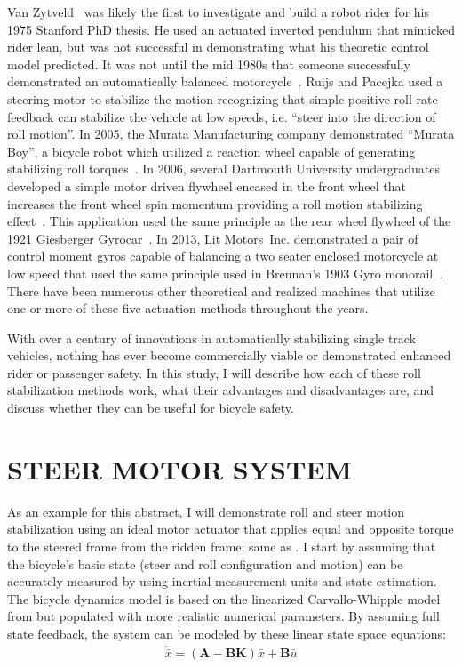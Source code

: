 \documentclass{icsc}
\begin{document}
Van Zytveld~\cite{Zytveld1975} was likely the first to investigate and build a
robot rider for his 1975 Stanford PhD thesis. He used an actuated inverted
pendulum that mimicked rider lean, but was not successful in demonstrating what
his theoretic control model predicted. It was not until the mid 1980s that
someone successfully demonstrated an automatically balanced
motorcycle~\cite{Ruijs1986a}. Ruijs and Pacejka used a steering motor to
stabilize the motion recognizing that simple positive roll rate feedback can
stabilize the vehicle at low speeds, i.e. ``steer into the direction of roll
motion''.
In 2005, the Murata Manufacturing company demonstrated ``Murata Boy'', a
bicycle robot which utilized a reaction wheel capable of generating stabilizing
roll torques~\cite{WikipediaAuthors2023}. In 2006, several Dartmouth University
undergraduates developed a simple motor driven flywheel encased in the front
wheel that increases the front wheel spin momentum providing a roll motion
stabilizing effect~\cite{Ward2006}. This application used the same principle as
the rear wheel flywheel of the 1921 Giesberger Gyrocar~\cite{Self2023}. In
2013, Lit Motors~Inc. demonstrated a pair of control moment gyros capable of
balancing a two seater enclosed motorcycle at low speed that used the same
principle used in Brennan's 1903 Gyro
monorail~\cite{WikipediaGyromonorail2012}. There have been numerous other
theoretical and realized machines that utilize one or more of these five
actuation methods throughout the years.

With over a century of innovations in automatically stabilizing single track
vehicles, nothing has ever become commercially viable or demonstrated enhanced
rider or passenger safety. In this study, I will describe how each of these
roll stabilization methods work, what their advantages and disadvantages are,
and discuss whether they can be useful for bicycle safety.

\section{STEER MOTOR SYSTEM}
%
As an example for this abstract, I will demonstrate roll and steer motion
stabilization using an ideal motor actuator that applies equal and opposite
torque to the steered frame from the ridden frame; same as \cite{Ruijs1986a}. I
start by assuming that the bicycle's basic state (steer and roll configuration
and motion) can be accurately measured by using inertial measurement units and
state estimation. The bicycle dynamics model is based on the linearized
Carvallo-Whipple model from \cite{Meijaard2007a} but populated with more
realistic numerical parameters. By assuming full state feedback, the system can
be modeled by these linear state space equations:
%
\begin{align}
  \dot{\bar{x}} = \left( \mathbf{A} - \mathbf{B} \mathbf{K} \right) \bar{x} + \mathbf{B} \bar{u}
\end{align}
\end{document}
